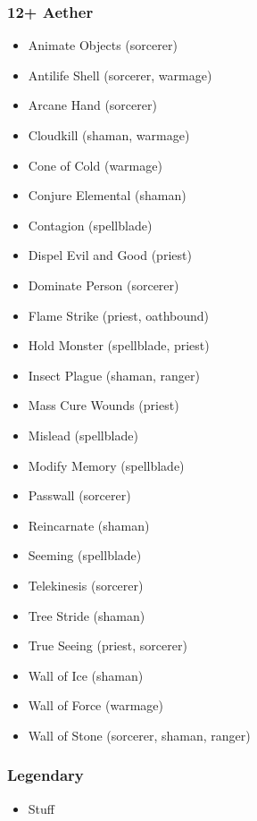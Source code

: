 \subsubsection{12+ Aether}
\begin{itemize}
\item Animate Objects (sorcerer)
\item Antilife Shell (sorcerer, warmage)
\item Arcane Hand (sorcerer)
\item Cloudkill (shaman, warmage)
\item Cone of Cold (warmage)
\item Conjure Elemental (shaman)
\item Contagion (spellblade)
\item Dispel Evil and Good (priest)
\item Dominate Person (sorcerer)
\item Flame Strike (priest, oathbound)
\item Hold Monster (spellblade, priest)
\item Insect Plague (shaman, ranger)
\item Mass Cure Wounds (priest)
\item Mislead (spellblade)
\item Modify Memory (spellblade)
\item Passwall (sorcerer)
\item Reincarnate (shaman)
\item Seeming (spellblade)
\item Telekinesis (sorcerer)
\item Tree Stride (shaman)
\item True Seeing (priest, sorcerer)
\item Wall of Ice (shaman)
\item Wall of Force (warmage)
\item Wall of Stone (sorcerer, shaman, ranger)
\end{itemize}

\subsubsection{Legendary}
\begin{itemize}
    \item Stuff
\end{itemize}





